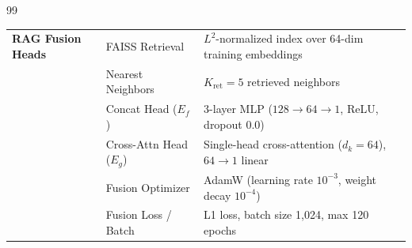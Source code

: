 \documentclass[preprint,12pt]{elsarticle}
\begin{document}
\begin{thebibliography}{99}
\begin{table}[ht]
{\begin{tabular}{lll}
\midrule
\textbf{RAG Fusion Heads} & FAISS Retrieval & $L^2$-normalized index over 64-dim training embeddings \\
 & Nearest Neighbors & $K_{\text{ret}} = 5$ retrieved neighbors \\
 & Concat Head ($E_f$) & 3-layer MLP ($128 \to 64 \to 1$, ReLU, dropout 0.0) \\
 & Cross-Attn Head ($E_g$) & Single-head cross-attention ($d_k = 64$), $64 \to 1$ linear \\
 & Fusion Optimizer & AdamW (learning rate $10^{-3}$, weight decay $10^{-4}$) \\
 & Fusion Loss / Batch & L1 loss, batch size 1,024, max 120 epochs \\
\bottomrule
\end{tabular}%
}
\end{table}

\end{thebibliography}
\end{document}
